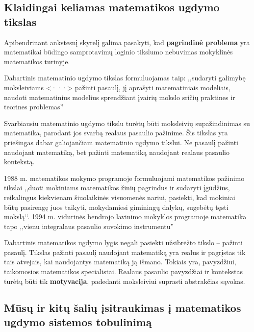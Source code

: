 \documentclass{article}
\begin{document}
\subsection{Klaidingai keliamas matematikos ugdymo tikslas}
Apibendrinant ankstesnį skyrelį galima pasakyti, kad \textbf{pagrindinė problema} yra matematikai būdingo samprotavimų loginio tikslumo nebuvimas mokyklinės matematikos turinyje.

Dabartinis matematinio ugdymo tikslas formuluojamas taip: ,,sudaryti galimybę moksleiviams <···> pažinti pasaulį, jį aprašyti matematiniais modeliais, naudoti matematinius modelius sprendžiant įvairių mokslo sričių praktines ir teorines problemas''

Svarbiausiu matematinio ugdymo tikslu turėtų būti moksleivių supažindinimas su matematika, parodant jos svarbą realaus pasaulio pažinime.  Šis  tikslas  yra  priešingas  dabar galiojančiam matematinio ugdymo tikslui. Ne pasaulį pažinti naudojant matematiką, bet pažinti matematiką naudojant realaus pasaulio kontekstą.

1988 m. matematikos mokymo programoje formuluojami matematikos pažinimo tikslai ,,duoti mokiniams matematikos žinių pagrindus ir sudaryti įgūdžius, reikalingus kiekvienam šiuolaikinės visuomenės nariui, pasiekti, kad mokiniai būtų pasirengę juos taikyti, mokydamiesi giminingų dalykų, sugebėtų tęsti mokslą‘‘.
1994 m. vidurinės bendrojo lavinimo mokyklos programoje matematika tapo ,,vienu integralaus pasaulio suvokimo instrumentu''

Dabartinis  matematikos  ugdymo  lygis  negali  pasiekti  užsibrėžto  tikslo – pažinti  pasaulį. Tikslas pažinti pasaulį naudojant matematiką yra realus ir pagrįstas tik tais atvejais, kai naudojantys matematiką ją išmano. Tokiais yra, pavyzdžiui, taikomosios matematikos specialistai. Realaus pasaulio pavyzdžiai ir kontekstas turėtų būti tik \textbf{motyvacija}, padedanti moksleiviui suprasti abstrakčias sąvokas.

\subsection{Mūsų ir kitų šalių įsitraukimas į matematikos ugdymo sistemos tobulinimą}
\end{document}
